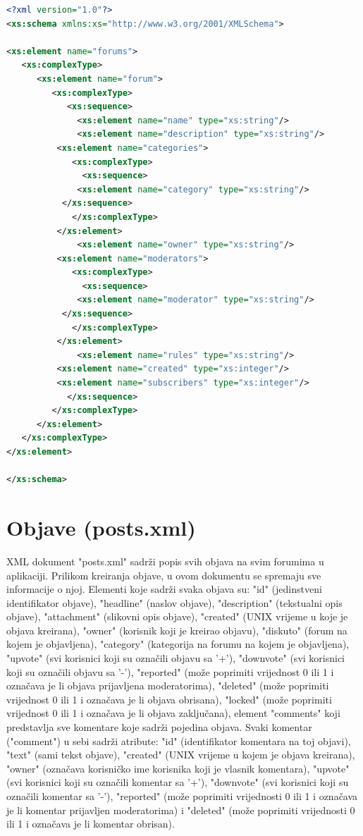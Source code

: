 \documentclass{foi}
\begin{document}
\begin{lstlisting}[language=XML]
 <?xml version="1.0"?>
<xs:schema xmlns:xs="http://www.w3.org/2001/XMLSchema">

<xs:element name="forums">
   <xs:complexType>
      <xs:element name="forum">
         <xs:complexType>
            <xs:sequence>
              <xs:element name="name" type="xs:string"/>
              <xs:element name="description" type="xs:string"/>
	      <xs:element name="categories">
	         <xs:complexType>
	           <xs:sequence>
		      <xs:element name="category" type="xs:string"/>
		   </xs:sequence>
	         </xs:complexType>
	      </xs:element>
              <xs:element name="owner" type="xs:string"/>
	      <xs:element name="moderators">
	         <xs:complexType>
	           <xs:sequence>
		      <xs:element name="moderator" type="xs:string"/>
		   </xs:sequence>
	         </xs:complexType>
	      </xs:element>
              <xs:element name="rules" type="xs:string"/>
	      <xs:element name="created" type="xs:integer"/>
	      <xs:element name="subscribers" type="xs:integer"/>
            </xs:sequence>
         </xs:complexType>
      </xs:element>
   </xs:complexType>
</xs:element>

</xs:schema> 
\end{lstlisting}

\section{Objave (posts.xml)}

XML dokument "posts.xml" sadrži popis svih objava na svim forumima u aplikaciji. Prilikom kreiranja objave, u ovom dokumentu se spremaju sve informacije o njoj.  Elementi koje sadrži svaka objava su: "id" (jedinstveni identifikator objave), "headline" (naslov objave), "description" (tekstualni opis objave), "attachment" (slikovni opis objave), "created" (UNIX vrijeme u koje je objava kreirana), "owner" (korisnik koji je kreirao objavu), "diskuto" (forum na kojem je objavljena), "category" (kategorija na forumu na kojem je objavljena), "upvote" (svi korisnici koji su označili objavu sa '+'), "downvote" (svi korisnici koji su označili objavu sa '-'), "reported" (može poprimiti vrijednost 0 ili 1 i označava je li objava prijavljena moderatorima), "deleted" (može poprimiti vrijednost 0 ili 1 i označava je li objava obrisana), "locked" (može poprimiti vrijednost 0 ili 1 i označava je li objava zaključana), element "comments" koji predstavlja sve komentare koje sadrži pojedina objava. Svaki komentar ("comment") u sebi sadrži atribute: "id" (identifikator komentara na toj objavi), "text" (sami tekst objave), "created" (UNIX vrijeme u kojem je objava kreirana), "owner" (označava korisničko ime korisnika koji je vlasnik komentara), "upvote" (svi korisnici koji su označili komentar sa '+'), "downvote" (svi korisnici koji su označili komentar sa '-'), "reported" (može poprimiti vrijednosti 0 ili 1 i označava je li komentar prijavljen moderatorima) i "deleted" (može poprimiti vrijednosti 0 ili 1 i označava je li komentar obrisan).
\end{document}
